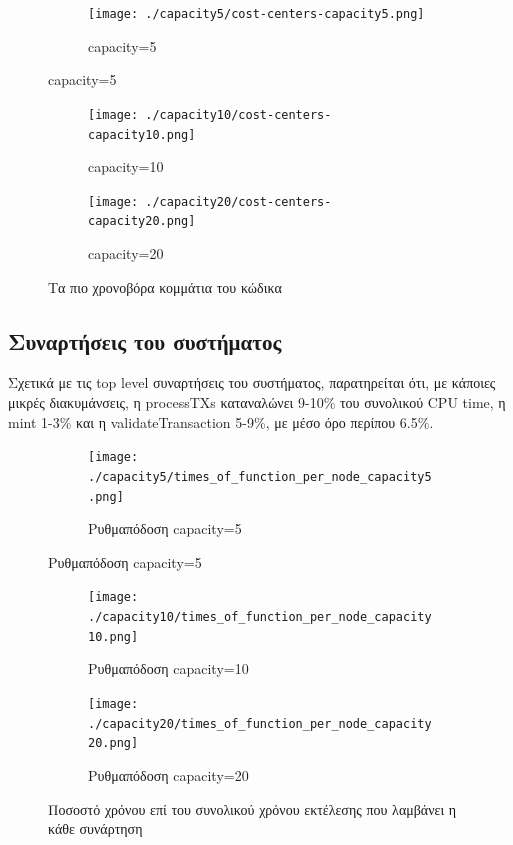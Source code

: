 \documentclass{article}
\newcommand{\eng}[1]{\foreignlanguage{english}{#1}} %
\begin{document}
\begin{figure}[ht]
    \centering
    \begin{subfigure}{\textwidth}
        \texttt{[image: ./capacity5/cost-centers-capacity5.png]}
        \caption{\eng{capacity=5}}
    \end{subfigure}
\end{figure}
\begin{figure}[ht]
    \ContinuedFloat
    \begin{subfigure}{\textwidth}
        \texttt{[image: ./capacity10/cost-centers-capacity10.png]}
        \caption{\eng{capacity=10}}
    \end{subfigure}
    \begin{subfigure}{\textwidth}
        \texttt{[image: ./capacity20/cost-centers-capacity20.png]}
        \caption{\eng{capacity=20}}
    \end{subfigure}
    \caption{Τα πιο χρονοβόρα κομμάτια του κώδικα}
    \label{fig:throughput-cost-centers}
\end{figure}
\FloatBarrier

\subsection{Συναρτήσεις του συστήματος}

Σχετικά με τις \eng{top level} συναρτήσεις του συστήματος, παρατηρείται ότι, με
κάποιες μικρές διακυμάνσεις, η \eng{processTXs} καταναλώνει 9-10\% του
συνολικού \eng{CPU time}, η \eng{mint} 1-3\% και η \eng{validateTransaction}
5-9\%, με μέσο όρο περίπου 6.5\%. 

\begin{figure}[ht]
    \centering
    \begin{subfigure}{\textwidth}
        \texttt{[image: ./capacity5/times\_of\_function\_per\_node\_capacity5.png]}
        \caption{Ρυθμαπόδοση \eng{capacity=5}}
    \end{subfigure}
\end{figure}
\begin{figure}[ht]
    \ContinuedFloat
    \begin{subfigure}{\textwidth}
        \texttt{[image: ./capacity10/times\_of\_function\_per\_node\_capacity10.png]}
        \caption{Ρυθμαπόδοση \eng{capacity=10}}
    \end{subfigure}
    \begin{subfigure}{\textwidth}
        \texttt{[image: ./capacity20/times\_of\_function\_per\_node\_capacity20.png]}
        \caption{Ρυθμαπόδοση \eng{capacity=20}}
    \end{subfigure}
    \caption{Ποσοστό χρόνου επί του συνολικού χρόνου εκτέλεσης που λαμβάνει η κάθε συνάρτηση}
\end{figure}
\FloatBarrier
\end{document}
